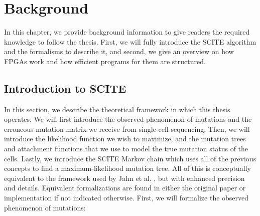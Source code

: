 \chapter{Background}
\label{ch:background}

In this chapter, we provide background information to give readers the required knowledge to follow the thesis. First, we will fully introduce the \ac{SCITE} algorithm and the formalisms to describe it, and second, we give an overview on how \acp{FPGA} work and how efficient programs for them are structured.

\section{Introduction to SCITE}

In this section, we describe the theoretical framework in which this thesis operates. We will first introduce the observed phenomenon of mutations and the erroneous mutation matrix we receive from single-cell sequencing. Then, we will introduce the likelihood function we wish to maximize, and the mutation trees and attachment functions that we use to model the true mutation status of the cells. Lastly, we introduce the \ac{SCITE} Markov chain which uses all of the previous concepts to find a maximum-likelihood mutation tree. All of this is conceptually equivalent to the framework used by Jahn et al. \cite{tree2016}, but with enhanced precision and details. Equivalent formalizations are found in either the original paper or implementation if not indicated otherwise. First, we will formalize the observed phenomenon of mutations:

